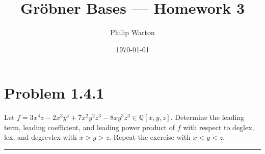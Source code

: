 \documentclass{article}
\theoremstyle{definition}
\begin{document}
\title{Gr{\"o}bner Bases --- Homework 3}
\author{Philip Warton}
\date{\today}
\maketitle
\section*{Problem 1.4.1}
Let $f = 3x^4z - 2x^3y^4 + 7x^2y^2z^3 - 8xy^3z^3 \in \mathbb{Q}[x,y,z]$.
Determine the leading term, leading coefficient, and leading power product of $f$
with respect to deglex, lex, and degrevlex with $x > y > z$. Repeat the exercise with $x < y < z$.
\\
\par\noindent\rule{\textwidth}{0.4pt}
\end{document}

